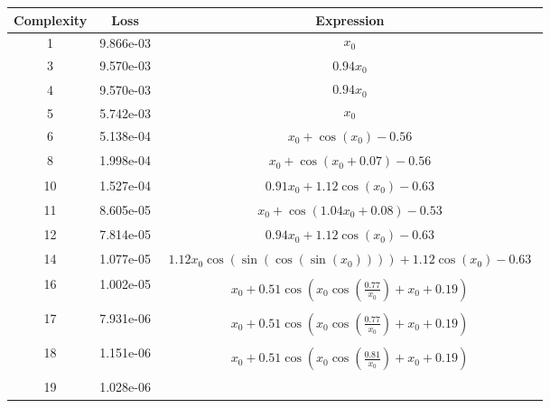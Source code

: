 \begin{center}
        \begin{tabular}{|c|c|c|}
        \hline
        Complexity & Loss & Expression \\
        \hline
        1 & 9.866e-03 & $\begin{aligned}x_{0}\end{aligned}$\\ \hline3 & 9.570e-03 & $\begin{aligned}0.94 x_{0}\end{aligned}$\\ \hline4 & 9.570e-03 & $\begin{aligned}0.94 x_{0}\end{aligned}$\\ \hline5 & 5.742e-03 & $\begin{aligned}x_{0}\end{aligned}$\\ \hline6 & 5.138e-04 & $\begin{aligned}x_{0} + \cos{\left(x_{0} \right)} - 0.56\end{aligned}$\\ \hline8 & 1.998e-04 & $\begin{aligned}x_{0} + \cos{\left(x_{0} + 0.07 \right)} - 0.56\end{aligned}$\\ \hline10 & 1.527e-04 & $\begin{aligned}0.91 x_{0} + 1.12 \cos{\left(x_{0} \right)} - 0.63\end{aligned}$\\ \hline11 & 8.605e-05 & $\begin{aligned}x_{0} + \cos{\left(1.04 x_{0} + 0.08 \right)} - 0.53\end{aligned}$\\ \hline12 & 7.814e-05 & $\begin{aligned}0.94 x_{0} + 1.12 \cos{\left(x_{0} \right)} - 0.63\end{aligned}$\\ \hline14 & 1.077e-05 & $\begin{aligned}1.12 x_{0} \cos{\left(\sin{\left(\cos{\left(\sin{\left(x_{0} \right)} \right)} \right)} \right)} + 1.12 \cos{\left(x_{0} \right)} - 0.63\end{aligned}$\\ \hline16 & 1.002e-05 & $\begin{aligned}x_{0} + 0.51 \cos{\left(x_{0} \cos{\left(\frac{0.77}{x_{0}} \right)} + x_{0} + 0.19 \right)}\end{aligned}$\\ \hline17 & 7.931e-06 & $\begin{aligned}x_{0} + 0.51 \cos{\left(x_{0} \cos{\left(\frac{0.77}{x_{0}} \right)} + x_{0} + 0.19 \right)}\end{aligned}$\\ \hline18 & 1.151e-06 & $\begin{aligned}x_{0} + 0.51 \cos{\left(x_{0} \cos{\left(\frac{0.81}{x_{0}} \right)} + x_{0} + 0.19 \right)}\end{aligned}$\\ \hline19 & 1.028e-06 & 
\end{tabular}
\end{center}
